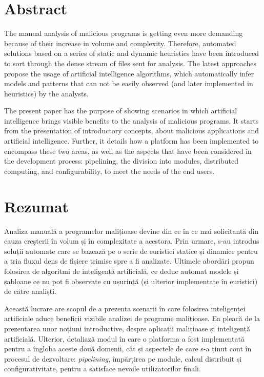 \chapter*{Abstract}

\thispagestyle{front}

The manual analysis of malicious programs is getting even more demanding because of their increase in volume and complexity. Therefore, automated solutions based on a series of static and dynamic heuristics have been introduced to sort through the dense stream of files sent for analysis. The latest approaches propose the usage of artificial intelligence algorithms, which automatically infer models and patterns that can not be easily observed (and later implemented in heuristics) by the analysts.

The present paper has the purpose of showing scenarios in which artificial intelligence brings visible benefits to the analysis of malicious programs. It starts from the presentation of introductory concepts, about malicious applications and artificial intelligence. Further, it details how a platform has been implemented to encompass these two areas, as well as the aspects that have been considered in the development process: pipelining, the division into modules, distributed computing, and configurability, to meet the needs of the end users.

\newpage

\chapter*{Rezumat}

Analiza manuală a programelor malițioase devine din ce în ce mai solicitantă din cauza creșterii în volum și în complexitate a acestora. Prin urmare, s-au introdus soluții automate care se bazează pe o serie de euristici statice și dinamice pentru a tria fluxul dens de fișiere trimise spre a fi analizate. Ultimele abordări propun folosirea de algoritmi de inteligență artificială, ce deduc automat mo\-dele și șabloane ce nu pot fi observate cu ușurință (și ulterior implementate în euristici) de către analiști.

Această lucrare are scopul de a prezenta scenarii în care folosirea inteligenței artificiale aduce beneficii vizibile analizei de programe malițioase. Ea pleacă de la prezentarea unor noțiuni introductive, despre aplicații malițioase și inteligență artificială. Ulterior, detaliază modul în care o platforma a fost implementată pentru a îngloba aceste două domenii, cât și aspectele de care s-a ținut cont în procesul de dezvoltare: \textit{pipelining}, împărțirea pe module, calcul distribuit și configurativitate, pentru a satisface nevoile utilizatorilor finali.

\thispagestyle{front}
